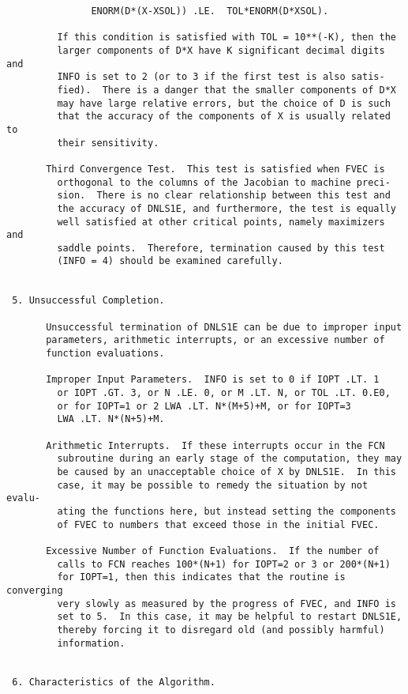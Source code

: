 \begin{verbatim}
               ENORM(D*(X-XSOL)) .LE.  TOL*ENORM(D*XSOL).

         If this condition is satisfied with TOL = 10**(-K), then the
         larger components of D*X have K significant decimal digits and
         INFO is set to 2 (or to 3 if the first test is also satis-
         fied).  There is a danger that the smaller components of D*X
         may have large relative errors, but the choice of D is such
         that the accuracy of the components of X is usually related to
         their sensitivity.

       Third Convergence Test.  This test is satisfied when FVEC is
         orthogonal to the columns of the Jacobian to machine preci-
         sion.  There is no clear relationship between this test and
         the accuracy of DNLS1E, and furthermore, the test is equally
         well satisfied at other critical points, namely maximizers and
         saddle points.  Therefore, termination caused by this test
         (INFO = 4) should be examined carefully.


 5. Unsuccessful Completion.

       Unsuccessful termination of DNLS1E can be due to improper input
       parameters, arithmetic interrupts, or an excessive number of
       function evaluations.

       Improper Input Parameters.  INFO is set to 0 if IOPT .LT. 1
         or IOPT .GT. 3, or N .LE. 0, or M .LT. N, or TOL .LT. 0.E0,
         or for IOPT=1 or 2 LWA .LT. N*(M+5)+M, or for IOPT=3
         LWA .LT. N*(N+5)+M.

       Arithmetic Interrupts.  If these interrupts occur in the FCN
         subroutine during an early stage of the computation, they may
         be caused by an unacceptable choice of X by DNLS1E.  In this
         case, it may be possible to remedy the situation by not evalu-
         ating the functions here, but instead setting the components
         of FVEC to numbers that exceed those in the initial FVEC.

       Excessive Number of Function Evaluations.  If the number of
         calls to FCN reaches 100*(N+1) for IOPT=2 or 3 or 200*(N+1)
         for IOPT=1, then this indicates that the routine is converging
         very slowly as measured by the progress of FVEC, and INFO is
         set to 5.  In this case, it may be helpful to restart DNLS1E,
         thereby forcing it to disregard old (and possibly harmful)
         information.


 6. Characteristics of the Algorithm.


\end{verbatim}
